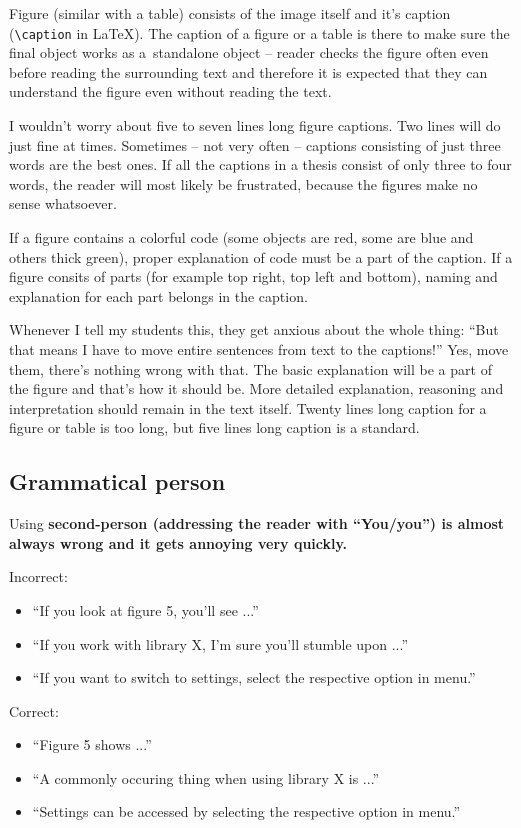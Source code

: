 Figure (similar with a table) consists of the image itself and it's caption (\texttt{\textbackslash caption} in LaTeX). The caption of a figure or a table is there to make sure the final object works as a~standalone object -- reader checks the figure often even before reading the surrounding text and therefore it is expected that they can understand the figure even without reading the text.

I wouldn't worry about five to seven lines long figure captions. Two lines will do just fine at times. Sometimes -- not very often -- captions consisting of just three words are the best ones. If all the captions in a thesis consist of only three to four words, the reader will most likely be frustrated, because the figures make no sense whatsoever.

If a figure contains a colorful code (some objects are red, some are blue and others thick green), proper explanation of code must be a part of the caption. If a figure consits of parts (for example top right, top left and bottom), naming and explanation for each part belongs in the caption.

Whenever I tell my students this, they get anxious about the whole thing: ``But that means I have to move entire sentences from text to the captions!'' Yes, move them, there's nothing wrong with that. The basic explanation will be a part of the figure and that's how it should be. More detailed explanation, reasoning and interpretation should remain in the text itself. Twenty lines long caption for a figure or table is too long, but five lines long caption is a standard.


\subsection*{Grammatical person}

Using \bf second-person \rm (addressing the reader with ``You/you'') is almost always wrong and it gets annoying very quickly.

Incorrect:
\begin{itemize}
  \item{``If you look at figure 5, you'll see ...''}
  \item{``If you work with library X, I'm sure you'll stumble upon ...''}
  \item{``If you want to switch to settings, select the respective option in menu.''}
\end{itemize}

Correct:
\begin{itemize}
  \item{``Figure 5 shows ...''}
  \item{``A commonly occuring thing when using library X is ...''}
  \item{``Settings can be accessed by selecting the respective option in menu.''}
\end{itemize}

